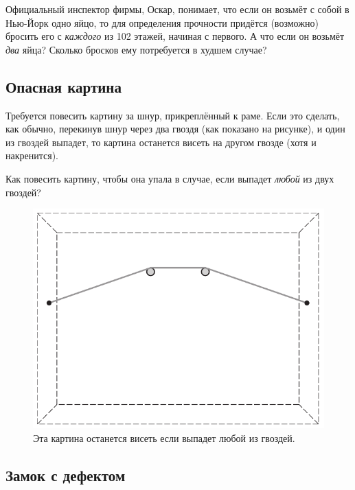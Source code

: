 Официальный инспектор фирмы, Оскар, понимает, что если он возьмёт с собой в Нью-Йорк одно яйцо,
то для определения прочности придётся (возможно) бросить его с \emph{каждого} из 102 %
этажей, начиная с первого.
А что если он возьмёт \emph{два} яйца?
Сколько бросков ему потребуется в худшем случае?



\subsection*{Опасная картина}

Требуется повесить картину за шнур, прикреплённый к раме.
Если это сделать, как обычно, перекинув шнур через два гвоздя (как показано на рисунке), и один из гвоздей выпадет, то картина останется висеть на другом гвозде (хотя и накренится).

Как повесить картину, чтобы она упала в случае, если выпадет \emph{любой} из двух гвоздей?

\begin{figure}[h!]
\centering
\includegraphics[scale=0.5]{pics/kartina1}
\caption{Эта картина останется висеть если выпадет любой из гвоздей.}
\label{pic:kartina1}
\end{figure}

\subsection*{Замок с дефектом}\label{Замок с дефектом}

